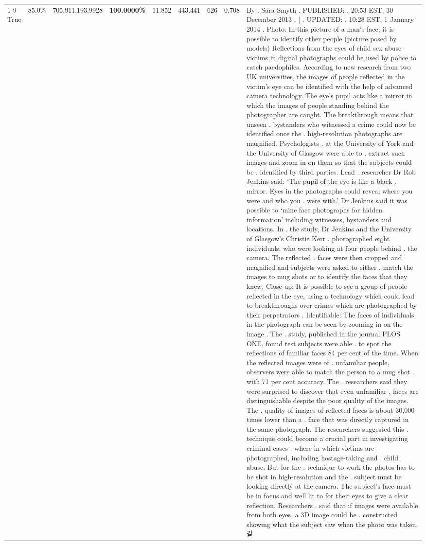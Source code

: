 \begin{table}[H]
\begin{tabular}{lllrlllll}
\cline{1-9}
True & 85.0\% & 705,911,193.9928 & \bfseries \color{red} 100.0000\% & 11.852 & 443.441 & 626 & 0.708 & By . Sara Smyth . PUBLISHED: . 20:53 EST, 30 December 2013 . | . UPDATED: . 10:28 EST, 1 January 2014 . Photo: In this picture of a man's face, it is possible to identify other people (picture posed by models) Reflections from the eyes of child sex abuse victims in digital photographs could be used by police to catch paedophiles. According to new research from two UK universities, the images of people reflected in the victim's eye can be identified with the help of advanced camera technology. The eye's pupil acts like a mirror in which the images of people standing behind the photographer are caught. The breakthrough means that unseen . bystanders who witnessed a crime could now be identified once the . high-resolution photographs are magnified. Psychologists . at the University of York and the University of Glasgow were able to . extract such images and zoom in on them so that the subjects could be . identified by third parties. Lead . researcher Dr Rob Jenkins said: ‘The pupil of the eye is like a black . mirror. Eyes in the photographs could reveal where you were and who you . were with.' Dr Jenkins said it was possible to ‘mine face photographs for hidden information' including witnesses, bystanders and locations. In . the study, Dr Jenkins and the University of Glasgow's Christie Kerr . photographed eight individuals, who were looking at four people behind . the camera. The reflected . faces were then cropped and magnified and subjects were asked to either . match the images to mug shots or to identify the faces that they knew. Close-up: It is possible to see a group of people reflected in the eye, using a technology which could lead to breakthroughs over crimes which are photographed by their perpetrators . Identifiable: The faces of individuals in the photograph can be seen by zooming in on the image . The . study, published in the journal PLOS ONE, found test subjects were able . to spot the reflections of familiar faces 84 per cent of the time. When the reflected images were of . unfamiliar people, observers were able to match the person to a mug shot . with 71 per cent accuracy. The . researchers said they were surprised to discover that even unfamiliar . faces are distinguishable despite the poor quality of the images. The . quality of images of reflected faces is about 30,000 times lower than a . face that was directly captured in the same photograph. The researchers suggested this . technique could become a crucial part in investigating criminal cases . where in which victims are photographed, including hostage-taking and . child abuse. But for the . technique to work the photos has to be shot in high-resolution and the . subject must be looking directly at the camera. The subject's face must be in focus and well lit to for their eyes to give a clear reflection. Researchers . said that if images were available from both eyes, a 3D image could be . constructed showing what the subject saw when the photo was taken.같 \\

\end{tabular}
\end{table}
